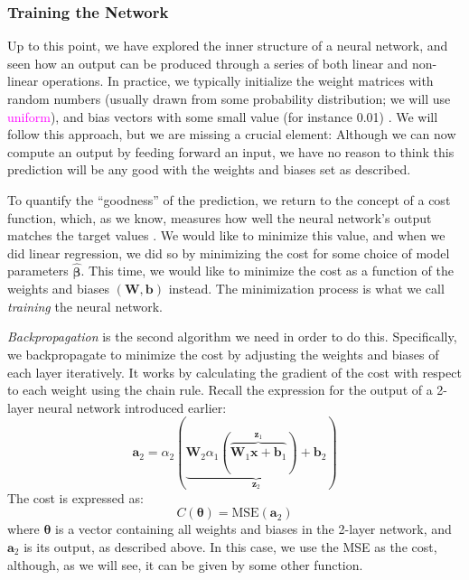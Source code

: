 \subsubsection{Training the Network}
Up to this point, we have explored the inner structure of a neural network, and seen how an output can be produced through a series of both linear and non-linear operations. In practice, we typically initialize the weight matrices with random numbers (usually drawn from some probability distribution; we will use \textcolor{magenta}{uniform}), and bias vectors with some small value (for instance 0.01) \cite{MHJweek42}. We will follow this approach, but we are missing a crucial element: Although we can now compute an output by feeding forward an input, we have no reason to think this prediction will be any good with the weights and biases set as described. 

To quantify the ``goodness'' of the prediction, we return to the concept of a cost function, which, as we know, measures how well the neural network's output matches the target values \cite{fysstkproject1}. We would like to minimize this value, and when we did linear regression, we did so by minimizing the cost for some choice of model parameters $\boldsymbol{\hat{\beta}}$. This time, we would like to minimize the cost as a function of the weights and biases $(\mathbf{W}, \boldsymbol b)$ instead. The minimization process is what we call \emph{training} the neural network. 

\emph{Backpropagation} is the second algorithm we need in order to do this. Specifically, we backpropagate to minimize the cost by adjusting the weights and biases of each layer iteratively. It works by calculating the gradient of the cost with respect to each weight using the chain rule. Recall the expression for the output of a 2-layer neural network introduced earlier:
\[\boldsymbol{a}_2 = \alpha_2(\underbrace{\mathbf W_2 \alpha_1(\overbrace{\mathbf W_1 \boldsymbol{x} + \boldsymbol b_1}^{\boldsymbol z_1})  + \boldsymbol b_2}_{\boldsymbol z_2})\]
The cost is expressed as:
\[C(\boldsymbol{\theta}) = \text{MSE}(\boldsymbol a_2)\]
where $\boldsymbol{\theta}$ is a vector containing all weights and biases in the 2-layer network, and $\boldsymbol a_2$ is its output, as described above. In this case, we use the MSE as the cost, although, as we will see, it can be given by some other function. 

